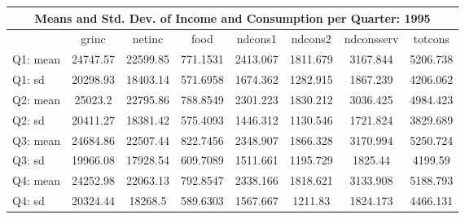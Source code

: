 \begin{tabular}{l*{7}{c}}
\hline\hline
\multicolumn{8}{c}{Means and Std. Dev. of Income and Consumption per Quarter: 1995}  \\
\hline    
            &       grinc&      netinc&        food&     ndcons1&     ndcons2&  ndconsserv&     totcons\\
\hline
Q1: mean      &    24747.57&    22599.85&    771.1531&    2413.067&    1811.679&    3167.844&    5206.738\\
Q1: sd     &    20298.93&    18403.14&    571.6958&    1674.362&    1282.915&    1867.239&    4206.062\\
Q2: mean     &     25023.2&    22795.86&    788.8549&    2301.223&    1830.212&    3036.425&    4984.423\\
Q2: sd     &    20411.27&    18381.42&    575.4093&    1446.312&    1130.546&    1721.824&    3829.689\\
Q3: mean      &    24684.86&    22507.44&    822.7456&    2348.907&    1866.328&    3170.994&    5250.724\\
Q3: sd      &    19966.08&    17928.54&    609.7089&    1511.661&    1195.729&     1825.44&     4199.59\\
Q4: mean     &    24252.98&    22063.13&    792.8547&    2338.166&    1818.621&    3133.908&    5188.793\\
Q4: sd    &    20324.44&     18268.5&    589.6303&    1567.667&     1211.83&    1824.173&    4466.131\\
\hline\hline
\end{tabular}
